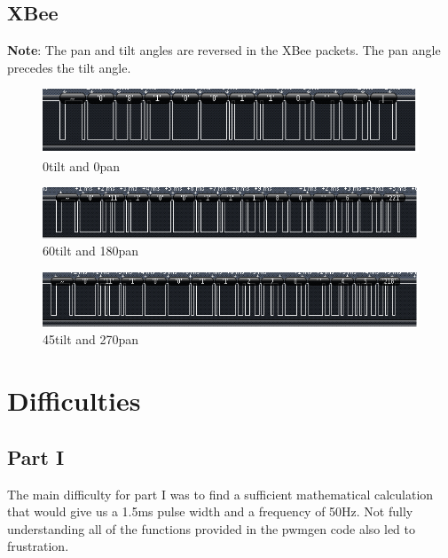 \documentclass[11pt, titlepage]{article}
\begin{document}
        \subsection{XBee}
            \textbf{Note}: The pan and tilt angles are reversed in the XBee packets. The pan angle precedes the tilt angle.
            \FloatBarrier
            \begin{figure}[h!]
                \centering
                \includegraphics[scale = 1.2]{Screenshots/0_0_XBee_Cropped.png}
                \caption{0\degree tilt and 0\degree pan}
            \end{figure}
            \FloatBarrier
            
            \FloatBarrier
            \begin{figure}[htbp]
                \centering
                \includegraphics[scale = 1]{Screenshots/60_180_XBee_Cropped.png}
                \caption{60\degree tilt and 180\degree pan}
            \end{figure}
            \FloatBarrier
            
            \FloatBarrier
            \begin{figure}[htbp]
                \centering
                \includegraphics[scale = 1]{Screenshots/45_270_XBee_Cropped.png}
                \caption{45\degree tilt and 270\degree pan}
            \end{figure}
            \FloatBarrier
    
    \section{Difficulties}
        \subsection{Part I}
            The main difficulty for part I was to find a sufficient mathematical calculation that would give us a 1.5ms pulse width and a frequency of 50Hz. Not fully understanding all of the functions provided in the pwmgen code also led to frustration. 
\end{document}
